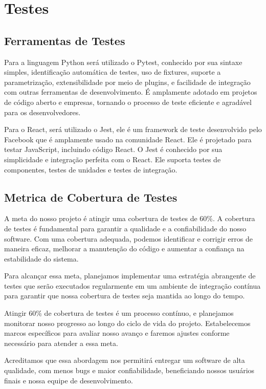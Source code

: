\section{Testes}

\subsection{Ferramentas de Testes}
Para a linguagem Python será utilizado o Pytest, conhecido por sua sintaxe simples, identificação automática de testes, uso de fixtures, suporte a parametrização, extensibilidade por meio de plugins, e facilidade de integração com outras ferramentas de desenvolvimento. É amplamente adotado em projetos de código aberto e empresas, tornando o processo de teste eficiente e agradável para os desenvolvedores.

Para o React, será utilizado o Jest, ele é um framework de teste desenvolvido pelo Facebook que é amplamente usado na comunidade React. Ele é projetado para testar JavaScript, incluindo código React. O Jest é conhecido por sua simplicidade e integração perfeita com o React. Ele suporta testes de componentes, testes de unidades e testes de integração.

\subsection{Metrica de Cobertura de Testes}
A meta do nosso projeto é atingir uma cobertura de testes de 60\%. A cobertura de testes é fundamental para garantir a qualidade e a confiabilidade do nosso software. Com uma cobertura adequada, podemos identificar e corrigir erros de maneira eficaz, melhorar a manutenção do código e aumentar a confiança na estabilidade do sistema.

Para alcançar essa meta, planejamos implementar uma estratégia abrangente de testes que serão executados regularmente em um ambiente de integração contínua para garantir que nossa cobertura de testes seja mantida ao longo do tempo.

Atingir 60\% de cobertura de testes é um processo contínuo, e planejamos monitorar nosso progresso ao longo do ciclo de vida do projeto. Estabelecemos marcos específicos para avaliar nosso avanço e faremos ajustes conforme necessário para atender a essa meta.

Acreditamos que essa abordagem nos permitirá entregar um software de alta qualidade, com menos bugs e maior confiabilidade, beneficiando nossos usuários finais e nossa equipe de desenvolvimento.


